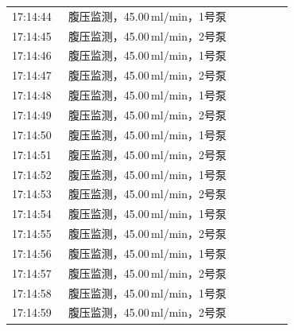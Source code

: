 \documentclass[UTF8,10pt,a4paper,fontset=fandol]{ctexart}
\begin{document}
\begin{center}
\begin{tabular}{p{0.18\linewidth}p{0.72\linewidth}}
17:14:44 & 腹压监测，45.00\,ml/min，1号泵\\
17:14:45 & 腹压监测，45.00\,ml/min，2号泵\\
17:14:46 & 腹压监测，45.00\,ml/min，1号泵\\
17:14:47 & 腹压监测，45.00\,ml/min，2号泵\\
17:14:48 & 腹压监测，45.00\,ml/min，1号泵\\
17:14:49 & 腹压监测，45.00\,ml/min，2号泵\\
17:14:50 & 腹压监测，45.00\,ml/min，1号泵\\
17:14:51 & 腹压监测，45.00\,ml/min，2号泵\\
17:14:52 & 腹压监测，45.00\,ml/min，1号泵\\
17:14:53 & 腹压监测，45.00\,ml/min，2号泵\\
17:14:54 & 腹压监测，45.00\,ml/min，1号泵\\
17:14:55 & 腹压监测，45.00\,ml/min，2号泵\\
17:14:56 & 腹压监测，45.00\,ml/min，1号泵\\
17:14:57 & 腹压监测，45.00\,ml/min，2号泵\\
17:14:58 & 腹压监测，45.00\,ml/min，1号泵\\
17:14:59 & 腹压监测，45.00\,ml/min，2号泵\\
\end{tabular}

\vspace{1em}


\end{center}
\end{document}
